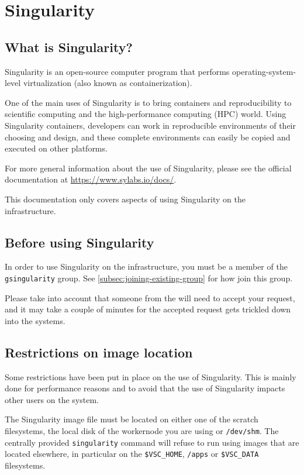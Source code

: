 \chapter{Singularity}
\label{ch:singularity}

\section{What is Singularity?}

Singularity is an open-source computer program that performs operating-system-level virtualization (also known as containerization).

One of the main uses of Singularity is to bring containers and reproducibility to
scientific computing and the high-performance computing (HPC) world.
Using Singularity containers, developers can work in reproducible environments of their choosing and design,
and these complete environments can easily be copied and executed on other platforms.

For more general information about the use of Singularity, please see the official documentation at \url{https://www.sylabs.io/docs/}.

This documentation only covers aspects of using Singularity on the \hpcInfra infrastructure.

\section{Before using Singularity}

In order to use Singularity on the \hpcInfra infrastructure, you must be a member of the \lstinline|gsingularity| group.
See \autoref{subsec:joining-existing-group} for how join this group.

Please take into account that someone from the \hpcTeam will need to accept your request,
and it may take a couple of minutes for the accepted request gets trickled down into the
\hpcInfra systems.

\section{Restrictions on image location}

Some restrictions have been put in place on the use of Singularity. This is mainly done
for performance reasons and to avoid that the use of Singularity impacts other users on the system.

The Singularity image file must be located on either one of the scratch filesystems,
the local disk of the workernode you are using or \lstinline|/dev/shm|. The centrally provided \lstinline|singularity|
command will refuse to run using images that are located elsewhere, in particular on the \lstinline|$VSC_HOME|,
\lstinline|/apps| or \lstinline|$VSC_DATA| filesystems.

